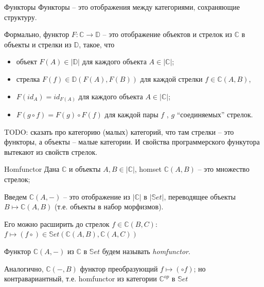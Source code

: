 \documentclass[
  russian,
  aspectratio=169,
  xcolor={svgnames},
  hyperref={colorlinks,citecolor=DeepPink4}]{beamer}
\begin{document}
\begin{frame}[fragile]{Функторы}
Функторы -- это отображения между категориями, сохраняющие структуру.
\vspace{1cm}

Формально, функтор $F: \mathbb{C} \rightarrow \mathbb{D}$ -- это отображение объектов и стрелок из $\mathbb{C}$ в объекты и стрелки из $\mathbb{D}$, такое, что
\begin{itemize}
 \item объект $F(A) \in |\mathbb{D}|$ для каждого объекта $A \in |\mathbb{C}|$;
 \item стрелка $F(f) \in \mathbb{D}(F(A), F(B))$ для каждой стрелки
$f \in\mathbb{C}(A, B)$,
 \item $F(id_A ) = id_{F(A)}$ для каждого объекта $A \in |\mathbb{C}|$;
 \item $F (g \circ f) = F (g) \circ F (f)$ для каждой пары $f$ , $g$ ``соединяемых'' стрелок.
\end{itemize}

TODO: сказать про категорию (малых) категорий, что там стрелки -- это функторы, а объекты -- малые категории. И свойства программерского функутора вытекают из свойств стрелок.
\end{frame}

\begin{frame}[fragile]{Homfunctor}
Дана $\mathbb{C}$ и объекты $A,B \in |\mathbb{C}|$, homset $\mathbb{C}(A, B)$ -- это множество стрелок; \vspace{0.5cm}

Введем $\mathbb{C}(A, −)$ -- это отображение из $|\mathbb{C}|$ в $|\mathbb{S}et|$, переводящее объекты $B \mapsto\mathbb{C}(A, B)$ (т.е. объекты в набор морфизмов). \vspace{0.5cm}

Его можно расширить до стрелок $f \in \mathbb{C}(B, C)$:\\
$f \mapsto (f \circ) \in \mathbb{S}et(\mathbb{C}(A, B), \mathbb{C}(A, C))$
\vspace{0.5cm}

Функтор $\mathbb{C}(A, −)$ из $\mathbb{C}$ в $\mathbb{S}et$ будем называть \textit{homfunctor}. \vspace{0.5cm}

Аналогично, $\mathbb{C}(−, B)$ функтор преобразующий $f\mapsto(\circ f)$; но контравариантный, т.е. homfunctor из категории $\mathbb{C}^{op}$ в
$\mathbb{S}et$

\end{frame}
\end{document}
